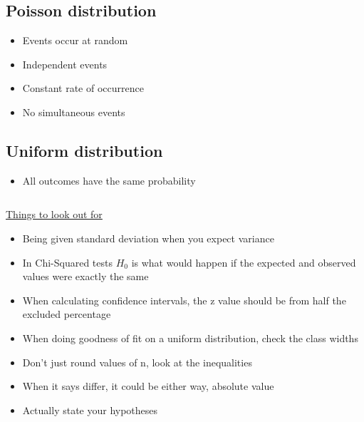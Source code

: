 \documentclass{article}[18pt]
\begin{document}
\subsection{Poisson distribution}
\begin{itemize}
\item Events occur at random
\item Independent events
\item Constant rate of occurrence
\item No simultaneous events
\end{itemize}
\subsection{Uniform distribution}
\begin{itemize}
\item All outcomes have the same probability
\end{itemize}
$ $\\
$ $\\
\begin{center}
\underline{\huge Things to look out for}
\end{center}
\begin{itemize}
\item Being given standard deviation when you expect variance
\item In Chi-Squared tests $H_0$ is what would happen if the expected and observed values were exactly the same
\item When calculating confidence intervals, the z value should be from half the excluded percentage
\item When doing goodness of fit on a uniform distribution, check the class widths
\item Don't just round values of n, look at the inequalities 
\item When it says differ, it could be either way, absolute value
\item Actually state your hypotheses 
\end{itemize}
\end{document}
